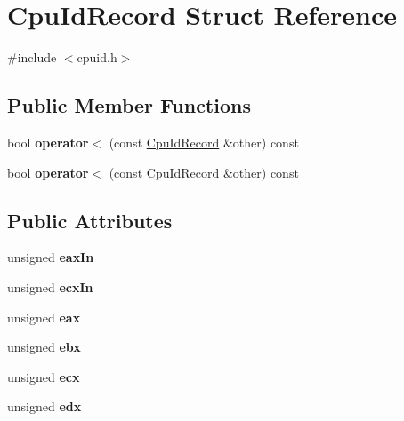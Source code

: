 \hypertarget{structCpuIdRecord}{\section{Cpu\-Id\-Record Struct Reference}
\label{structCpuIdRecord}
}


{\ttfamily \#include $<$cpuid.\-h$>$}

\subsection*{Public Member Functions}
\begin{DoxyCompactItemize}
\item 
\hypertarget{structCpuIdRecord_ac22508a164c283b85b40a5fd252bb717}{bool {\bfseries operator$<$} (const \hyperlink{structCpuIdRecord}{Cpu\-Id\-Record} \&other) const }\label{structCpuIdRecord_ac22508a164c283b85b40a5fd252bb717}

\item 
\hypertarget{structCpuIdRecord_ac22508a164c283b85b40a5fd252bb717}{bool {\bfseries operator$<$} (const \hyperlink{structCpuIdRecord}{Cpu\-Id\-Record} \&other) const }\label{structCpuIdRecord_ac22508a164c283b85b40a5fd252bb717}

\end{DoxyCompactItemize}
\subsection*{Public Attributes}
\begin{DoxyCompactItemize}
\item 
\hypertarget{structCpuIdRecord_a29cb7064576934fde031217dc72748eb}{unsigned {\bfseries eax\-In}}\label{structCpuIdRecord_a29cb7064576934fde031217dc72748eb}

\item 
\hypertarget{structCpuIdRecord_a0550345b9fca22f5a71f562cf9aa798b}{unsigned {\bfseries ecx\-In}}\label{structCpuIdRecord_a0550345b9fca22f5a71f562cf9aa798b}

\item 
\hypertarget{structCpuIdRecord_a00980ac5f6f5843e58347584158bbfb3}{unsigned {\bfseries eax}}\label{structCpuIdRecord_a00980ac5f6f5843e58347584158bbfb3}

\item 
\hypertarget{structCpuIdRecord_a54bcb48b9c8c83ac59fc529a31b5090a}{unsigned {\bfseries ebx}}\label{structCpuIdRecord_a54bcb48b9c8c83ac59fc529a31b5090a}

\item 
\hypertarget{structCpuIdRecord_ac19e67764ed1acc358e9326582bbc82f}{unsigned {\bfseries ecx}}\label{structCpuIdRecord_ac19e67764ed1acc358e9326582bbc82f}

\item 
\hypertarget{structCpuIdRecord_a7e89950c616061d3031f1298eaf436d5}{unsigned {\bfseries edx}}\label{structCpuIdRecord_a7e89950c616061d3031f1298eaf436d5}

\end{DoxyCompactItemize}



